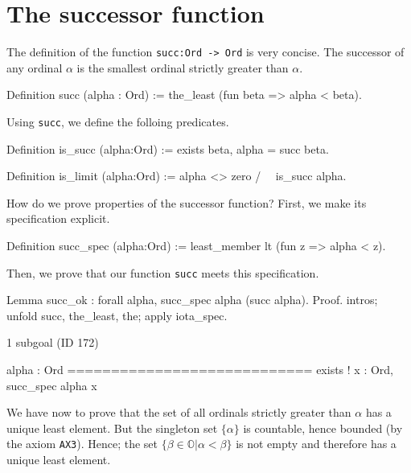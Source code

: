 {\section{The  successor function}

The definition of the function \texttt{succ:Ord -> Ord} is very concise. The successor of any ordinal $\alpha$ is the smallest ordinal strictly greater than $\alpha$.

\label{Functions:succ-sch}

\begin{Coqsrc}
Definition succ (alpha : Ord) := the_least (fun beta => alpha < beta).
\end{Coqsrc}

Using \texttt{succ}, we define the folloing predicates.

\begin{Coqsrc}
Definition is_succ (alpha:Ord) := exists beta, alpha = succ beta.

Definition is_limit (alpha:Ord) := alpha <> zero /\ ~ is_succ alpha.
\end{Coqsrc}




How do we prove properties of the successor function?
First, we make its specification explicit.

\begin{Coqsrc}
Definition succ_spec (alpha:Ord) :=
  least_member   lt (fun z => alpha < z).
\end{Coqsrc}

Then, we prove that our function \texttt{succ} meets this specification. 


\begin{Coqsrc}
Lemma succ_ok : forall alpha,  succ_spec alpha  (succ alpha).
Proof.
  intros; unfold succ, the_least, the;  apply iota_spec.
\end{Coqsrc}

\begin{Coqanswer}
1 subgoal (ID 172)
  
  alpha : Ord
  ============================
  exists ! x : Ord, succ_spec alpha x
\end{Coqanswer}

We have now to prove that the set of all ordinals strictly greater than $\alpha$ has a unique least element. But the singleton set $\{\alpha\}$ is countable, hence  bounded (by the axiom \texttt{AX3}). Hence; the set $\{\beta\in\mathbb{O}|\alpha < \beta\}$ is not empty
and therefore has a unique least element.

}
